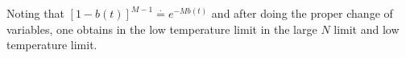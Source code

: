\documentclass[letterpaper,english,10pt]{article}
\begin{document}
Noting that $[1 - b(t)]^{M-1} \stackrel{\cdot}{=}  e^{-Mb(t)}$ and after doing the proper change of variables, one obtains in the low temperature limit
in the large $N$ limit and low temperature limit. 
\end{document}
